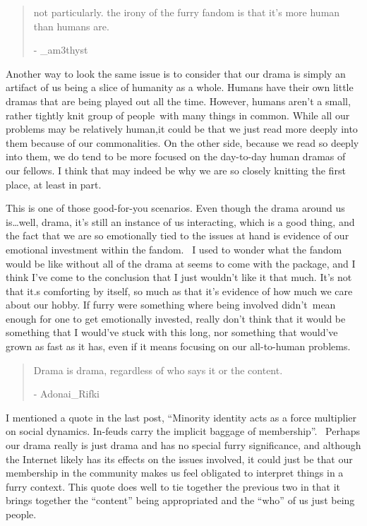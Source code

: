 \begin{quote}
not particularly. the irony of the furry fandom is that it's more human
than humans are.

- \_am3thyst
\end{quote}

Another way to look the same issue is to consider that our drama is
simply an artifact of us being a slice of humanity as a whole. Humans
have their own little dramas that are being played out all the time.
However, humans aren't a small, rather tightly knit group of people~with
many things in common. While all our problems may be relatively human,it
could be that we just read more deeply into them because of our
commonalities. On the other side, because we read so deeply into them,
we do tend to be more focused on the day-to-day human dramas of our
fellows. I think that may indeed be why we are so closely knitting the
first place, at least in part.

This is one of those good-for-you scenarios. Even though the drama
around us is\ldots{}well, drama, it's still an instance of us
interacting, which is a good thing, and the fact that we are so
emotionally tied to the issues at hand is evidence of our emotional
investment within the fandom. ~I used to wonder what the fandom would be
like without all of the drama at seems to come with the package, and I
think I've come to the conclusion that I just wouldn't like it that
much. It's not that it.s comforting by itself, so much as that it's
evidence of how much we care about our hobby. If furry were something
where being involved didn't~mean enough for one to get emotionally
invested, really don't think that it would be something that I would've
stuck with this long, nor something that would've grown as fast as it
has, even if it means focusing on our all-to-human problems.

\begin{quote}
Drama is drama, regardless of who says it or the content.

- Adonai\_Rifki
\end{quote}

I mentioned a quote in the last post, ``Minority identity acts as a
force multiplier on social dynamics. In-feuds carry the implicit baggage
of membership''. ~Perhaps our drama really is just drama and has no
special furry significance, and although the Internet likely has its
effects on the issues involved, it could just be that our membership in
the community makes us feel obligated to interpret things in a furry
context. This quote does well to tie together the previous two in that
it brings together the ``content'' being appropriated and the ``who'' of
us just being people.

